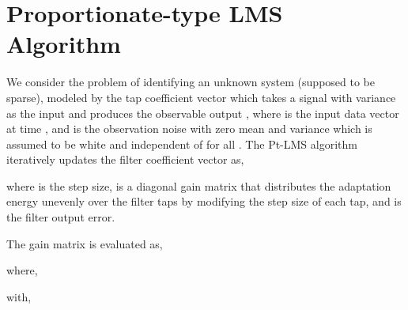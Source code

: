 \documentclass[journal, one column]{IEEEtran}
\begin{document}
\section{Proportionate-type LMS Algorithm}
We consider the problem of identifying an unknown system (supposed to
be sparse), modeled by the  tap coefficient vector 
which takes a signal  with variance 
as the input and produces the observable output
, where
 is the
input data vector at time , and  is the observation
noise with zero mean and variance  which is assumed to be white and independent of
 for all . The Pt-LMS algorithm iteratively updates
the filter coefficient vector  as,

where   is the step size,  is a diagonal gain
matrix that distributes the adaptation energy unevenly over the
filter taps by modifying the step size of each tap, and
 is the filter output
error.
\par

The gain matrix  is evaluated as,

where,

with,
\end{document}
